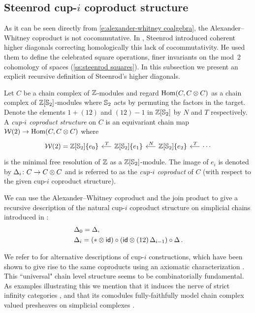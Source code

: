 \subsection{Steenrod cup-$i$ coproduct structure} \label{ss:cup-i}

As it can be seen directly from \eqref{e:alexander-whitney coalgebra}, the Alexander--Whitney coproduct is not cocommutative.
In \cite{steenrod1947products}, Steenrod introduced coherent higher diagonals correcting homologically this lack of cocommutativity.
He used them to define the celebrated square operations, finer invariants on the mod~2 cohomology of spaces (\cref{ss:steenrod squares}).
In this subsection we present an explicit recursive definition of Steenrod's higher diagonals.

Let $C$ be a chain complex of $\mathbb{Z}$-modules and regard $\mathrm{Hom}(C, C \otimes C)$ as a chain complex of $\mathbb{Z}[\mathbb{S}_2]$-modules where $\mathbb{S}_2$ acts by permuting the factors in the target.
Denote the elements $1 + (12)$ and $(12) - 1$ in $\mathbb{Z}[\mathbb{S}_2]$ by $N$ and $T$ respectively.
A \textit{cup-$i$ coproduct structure} on $C$ is an equivariant chain map
$\mathcal{W}(2) \to \mathrm{Hom}(C, C \otimes C)$ where
\begin{equation} \label{e:minimal resolution r=2}
	\begin{tikzcd} [column sep = .5cm]
		\mathcal W(2) = \Z[\Sym_2]\{e_0\} & \arrow[l, "\,T"'] \Z[\Sym_2]\{e_1\} & \arrow[l, "\,N"'] \Z[\Sym_2]\{e_2\} & \arrow[l, "\,T"'] \cdots
	\end{tikzcd}
\end{equation}
is the minimal free resolution of $\mathbb{Z}$ as a $\mathbb{Z}[\mathbb{S}_2]$-module.
The image of $e_i$ is denoted by $\operatorname{\Delta}_i \colon C \to C \otimes C$ and is referred to as the \textit{cup-$i$ coproduct} of $C$ (with respect to the given cup-$i$ coproduct structure).

We can use the Alexander--Whitney coproduct and the join product to give a recursive description of the natural cup-$i$ coproduct structure on simplicial chains introduced in \cite[p.293]{steenrod1947products}:
\begin{equation} \label{e:cup-i coproducts}
	\begin{split}
		& \operatorname{\Delta}_0 = \operatorname{\Delta}, \\
		& \operatorname{\Delta}_i =
		(\ast \otimes \mathsf{id}) \circ (\mathsf{id} \otimes (12)\operatorname{\Delta}_{i-1}) \circ \operatorname{\Delta}.
	\end{split}
\end{equation}

We refer to \cite{mcclure2003multivariable, gonzalez-diaz1999steenrod,medina2023fast_sq} for alternative descriptions of \mbox{cup-$i$} constructions, which have been shown to give rise to the same coproducts using an axiomatic characterization \cite{medina2022axiomatic}.
This ``universal" chain level structure seems to be combinatorially fundamental.
As examples illustrating this we mention that it induces the nerve of strict infinity categories \cite{street1987orientals, medina2020globular}, and that its comodules fully-faithfully model chain complex valued presheaves on simplicial complexes \cite{medina2022assembly}.


